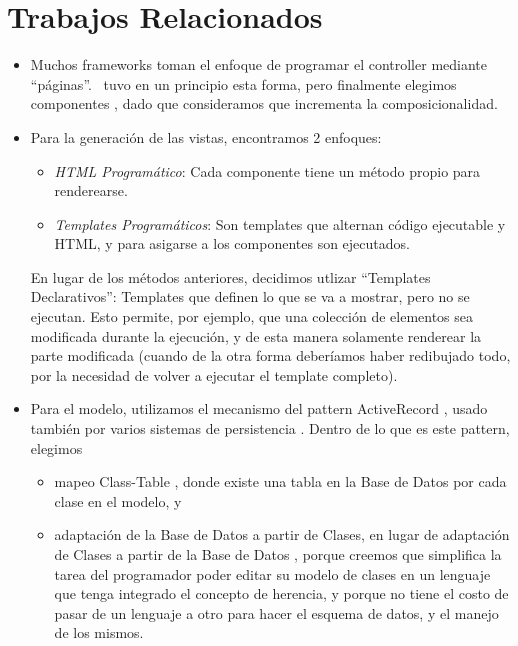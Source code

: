 \section{Trabajos Relacionados}

\begin{itemize}
\item Muchos frameworks toman el enfoque de programar el controller mediante ``páginas''\cite{cake, RoR}. \PWB\ tuvo en un principio esta forma, pero finalmente elegimos componentes \cite{seaside,Duca04e}, dado que consideramos que incrementa la composicionalidad.


\item Para la generación de las vistas, encontramos 2 enfoques:
\begin{itemize}
\item \emph{HTML Programático}: Cada componente tiene un método propio para renderearse.
\item \emph{Templates Programáticos}: Son templates que alternan código ejecutable y HTML, y para asigarse a los componentes son ejecutados.
\end{itemize}
En lugar de los métodos anteriores, decidimos utlizar ``Templates Declarativos'': Templates que definen lo que se va a mostrar, pero no se ejecutan. Esto permite, por ejemplo, que una colección de elementos sea modificada durante la ejecución, y de esta manera solamente renderear la parte modificada (cuando de la otra forma deberíamos haber redibujado todo, por la necesidad de volver a ejecutar el template completo).


\item Para el modelo, utilizamos el mecanismo del pattern ActiveRecord \cite{activerecord}, usado también por varios sistemas de persistencia \cite{hibernate, RoR, glorp, cake}. Dentro de lo que es este pattern, elegimos
\begin{itemize}
\item mapeo Class-Table \cite{classtable}, donde existe una tabla en la Base de Datos por cada clase en el modelo, y
\item adaptación de la Base de Datos a partir de Clases, en lugar de adaptación de Clases a partir de la Base de Datos \cite{RoR, cake}, porque creemos que simplifica la tarea del programador poder editar su modelo de clases en un lenguaje que tenga integrado el concepto de herencia, y porque no tiene el costo de pasar de un lenguaje a otro para hacer el esquema de datos, y el manejo de los mismos.
\end{itemize}


\end{itemize}
